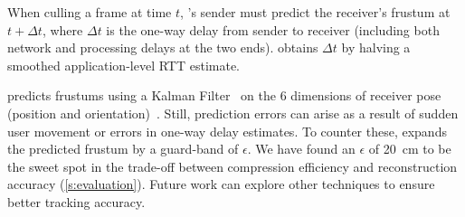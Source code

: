 	


%  
When culling a frame at time $t$, \livo's sender must predict the receiver's frustum at $t+\Delta t$, where $\Delta t$ is the one-way delay from sender to receiver (including both network and processing delays at the two ends).
%
\livo obtains $\Delta t$ by halving a smoothed application-level RTT estimate.

\livo{} predicts frustums using a Kalman Filter~\cite{kalman-original} on the 6 dimensions of receiver pose (position and orientation)~\cite{kalman-filter-mm}.
%
Still, prediction errors can arise as a result of sudden user movement or errors in one-way delay estimates.
%
To counter these, \livo expands the predicted frustum by a guard-band of $\epsilon$.
%
We have found an $\epsilon$ of 20~cm to be the sweet spot in the trade-off between compression efficiency and reconstruction accuracy (\cref{s:evaluation}).
%
Future work can explore other techniques to ensure better tracking accuracy.





